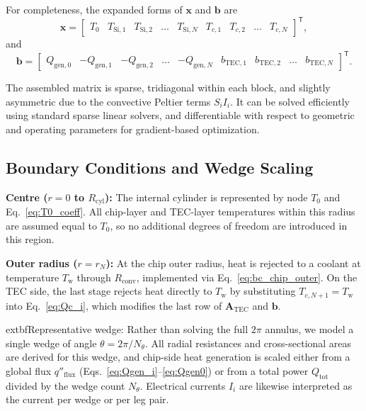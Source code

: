 \documentclass[conference]{IEEEtran}
\begin{document}
For completeness, the expanded forms of $\mathbf{x}$ and $\mathbf{b}$ are
\begin{equation}
	\mathbf{x} =
	\begin{bmatrix}
		T_0 & T_{\text{Si},1} & T_{\text{Si},2} & \dots & T_{\text{Si},N} & T_{c,1} & T_{c,2} & \dots & T_{c,N}
	\end{bmatrix}^{\!\mathsf{T}},
\end{equation}
and
\begin{equation}
	\mathbf{b} =
	\begin{bmatrix}
		Q_{\text{gen},0} & -Q_{\text{gen},1} & -Q_{\text{gen},2} & \dots & -Q_{\text{gen},N} & b_{\text{TEC},1} & b_{\text{TEC},2} & \dots & b_{\text{TEC},N}
	\end{bmatrix}^{\!\mathsf{T}}.
\end{equation}

The assembled matrix is sparse, tridiagonal within each block, and slightly asymmetric due to the convective Peltier terms $S_i I_i$. It can be solved efficiently using standard sparse linear solvers, and differentiable with respect to geometric and operating parameters for gradient-based optimization.

\subsection*{Boundary Conditions and Wedge Scaling}

	\textbf{Centre ($r=0$ to $R_{\text{cyl}}$):} The internal cylinder is represented by node $T_0$ and Eq.~\eqref{eq:T0_coeff}. All chip-layer and TEC-layer temperatures within this radius are assumed equal to $T_0$, so no additional degrees of freedom are introduced in this region.

	\textbf{Outer radius ($r = r_N$):} At the chip outer radius, heat is rejected to a coolant at temperature $T_{\text{w}}$ through $R_{\text{conv}}$, implemented via Eq.~\eqref{eq:bc_chip_outer}. On the TEC side, the last stage rejects heat directly to $T_{\text{w}}$ by substituting $T_{c,N+1} = T_{\text{w}}$ into Eq.~\eqref{eq:Qc_i}, which modifies the last row of $\mathbf{A}_{\text{TEC}}$ and $\mathbf{b}$.

		extbf{Representative wedge:} Rather than solving the full $2\pi$ annulus, we model a single wedge of angle $\theta = 2\pi/N_\theta$. All radial resistances and cross-sectional areas are derived for this wedge, and chip-side heat generation is scaled either from a global flux $q''_{\text{flux}}$ (Eqs.~\eqref{eq:Qgen_i}--\eqref{eq:Qgen0}) or from a total power $Q_{\text{tot}}$ divided by the wedge count $N_\theta$. Electrical currents $I_i$ are likewise interpreted as the current per wedge or per leg pair.
\end{document}
